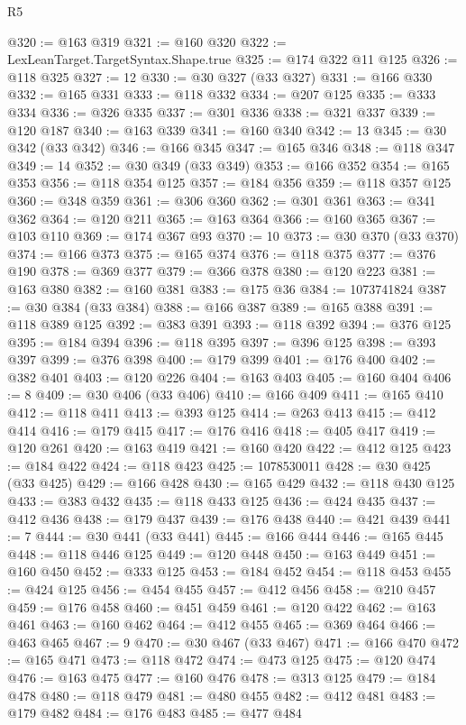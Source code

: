 \begin{lexlean}{R5}
\begin{coremodule}
@320 := @163 @319
@321 := @160 @320
@322 := LexLeanTarget.TargetSyntax.Shape.true
@325 := @174 @322 @11 @125
@326 := @118 @325
@327 := 12
@330 := @30 @327 (@33 @327)
@331 := @166 @330
@332 := @165 @331
@333 := @118 @332
@334 := @207 @125
@335 := @333 @334
@336 := @326 @335
@337 := @301 @336
@338 := @321 @337
@339 := @120 @187
@340 := @163 @339
@341 := @160 @340
@342 := 13
@345 := @30 @342 (@33 @342)
@346 := @166 @345
@347 := @165 @346
@348 := @118 @347
@349 := 14
@352 := @30 @349 (@33 @349)
@353 := @166 @352
@354 := @165 @353
@356 := @118 @354 @125
@357 := @184 @356
@359 := @118 @357 @125
@360 := @348 @359
@361 := @306 @360
@362 := @301 @361
@363 := @341 @362
@364 := @120 @211
@365 := @163 @364
@366 := @160 @365
@367 := @103 @110
@369 := @174 @367 @93
@370 := 10
@373 := @30 @370 (@33 @370)
@374 := @166 @373
@375 := @165 @374
@376 := @118 @375
@377 := @376 @190
@378 := @369 @377
@379 := @366 @378
@380 := @120 @223
@381 := @163 @380
@382 := @160 @381
@383 := @175 @36
@384 := 1073741824
@387 := @30 @384 (@33 @384)
@388 := @166 @387
@389 := @165 @388
@391 := @118 @389 @125
@392 := @383 @391
@393 := @118 @392
@394 := @376 @125
@395 := @184 @394
@396 := @118 @395
@397 := @396 @125
@398 := @393 @397
@399 := @376 @398
@400 := @179 @399
@401 := @176 @400
@402 := @382 @401
@403 := @120 @226
@404 := @163 @403
@405 := @160 @404
@406 := 8
@409 := @30 @406 (@33 @406)
@410 := @166 @409
@411 := @165 @410
@412 := @118 @411
@413 := @393 @125
@414 := @263 @413
@415 := @412 @414
@416 := @179 @415
@417 := @176 @416
@418 := @405 @417
@419 := @120 @261
@420 := @163 @419
@421 := @160 @420
@422 := @412 @125
@423 := @184 @422
@424 := @118 @423
@425 := 1078530011
@428 := @30 @425 (@33 @425)
@429 := @166 @428
@430 := @165 @429
@432 := @118 @430 @125
@433 := @383 @432
@435 := @118 @433 @125
@436 := @424 @435
@437 := @412 @436
@438 := @179 @437
@439 := @176 @438
@440 := @421 @439
@441 := 7
@444 := @30 @441 (@33 @441)
@445 := @166 @444
@446 := @165 @445
@448 := @118 @446 @125
@449 := @120 @448
@450 := @163 @449
@451 := @160 @450
@452 := @333 @125
@453 := @184 @452
@454 := @118 @453
@455 := @424 @125
@456 := @454 @455
@457 := @412 @456
@458 := @210 @457
@459 := @176 @458
@460 := @451 @459
@461 := @120 @422
@462 := @163 @461
@463 := @160 @462
@464 := @412 @455
@465 := @369 @464
@466 := @463 @465
@467 := 9
@470 := @30 @467 (@33 @467)
@471 := @166 @470
@472 := @165 @471
@473 := @118 @472
@474 := @473 @125
@475 := @120 @474
@476 := @163 @475
@477 := @160 @476
@478 := @313 @125
@479 := @184 @478
@480 := @118 @479
@481 := @480 @455
@482 := @412 @481
@483 := @179 @482
@484 := @176 @483
@485 := @477 @484

\end{coremodule}
\end{lexlean}
